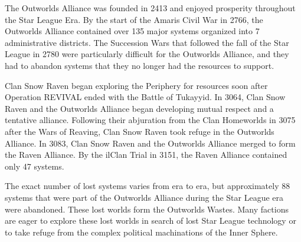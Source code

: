 The Outworlds Alliance was founded in 2413 and enjoyed prosperity throughout the Star League Era.
By the start of the Amaris Civil War in 2766, the Outworlds Alliance contained over 135 major systems organized into 7 administrative districts.
The Succession Wars that followed the fall of the Star League in 2780 were particularly difficult for the Outworlds Alliance, and they had to abandon systems that they no longer had the resources to support.

Clan Snow Raven began exploring the Periphery for resources soon after Operation REVIVAL ended with the Battle of Tukayyid.
In 3064, Clan Snow Raven and the Outworlds Alliance began developing mutual respect and a tentative alliance.
Following their abjuration from the Clan Homeworlds in 3075 after the Wars of Reaving, Clan Snow Raven took refuge in the Outworlds Alliance.
In 3083, Clan Snow Raven and the Outworlds Alliance merged to form the Raven Alliance.
By the ilClan Trial in 3151, the Raven Alliance contained only 47 systems.

The exact number of lost systems varies from era to era, but approximately 88 systems that were part of the Outworlds Alliance during the Star League era were abandoned.
These lost worlds form the Outworlds Wastes.
Many factions are eager to explore these lost worlds in search of lost Star League technology or to take refuge from the complex political machinations of the Inner Sphere.
